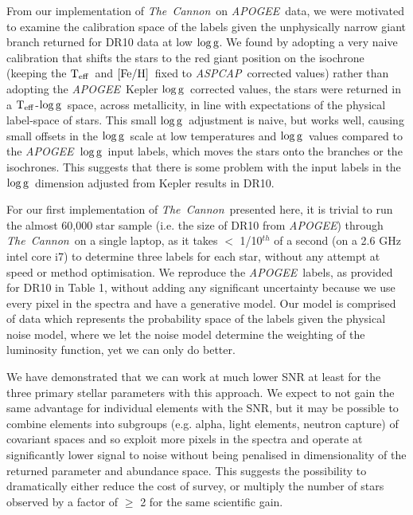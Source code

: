 \documentclass[12pt, preprint]{aastex}
\newcommand{\teff}{\mbox{$\rm T_{eff}$}}
\newcommand{\feh}{\mbox{$\rm [Fe/H]$}}
\newcommand{\logg}{\mbox{$\rm \log g$}}
\newcommand{\tc}{\textsl{The~Cannon}}
\newcommand{\apogee}{\textsl{APOGEE}}
\newcommand{\aspcap}{\textsl{ASPCAP}}
\begin{document}
From our implementation of \tc\ on \apogee\ data, we were motivated to examine the calibration space of the labels given the unphysically narrow giant branch returned for DR10 data at low \logg. We found by adopting a very naive calibration that shifts the stars to the red giant position on the isochrone (keeping the \teff\ and \feh\ fixed to \aspcap\ corrected values) rather than adopting the \apogee\ Kepler \logg\ corrected values, the stars were returned in a \teff-\logg\ space, across metallicity, in line with expectations of the physical label-space of stars. This small \logg\ adjustment is naive, but works well, causing small offsets in the \logg\ scale at low temperatures and \logg\ values compared to the \apogee\ \logg\ input labels, which moves the stars onto the branches or the isochrones. This suggests that there is some problem with the input labels in the \logg\ dimension adjusted from Kepler results in DR10. 

 For our first implementation of \tc\ presented here, it is trivial to run the almost 60,000 star sample (i.e. the size of DR10 from \apogee) through \tc\ on a single laptop, as it takes $<$ 1/10$^{th}$ of a second (on a 2.6 GHz intel core i7) to determine three labels for each star, without any attempt at speed or method optimisation. We reproduce the \apogee\ labels, as provided for DR10 in Table 1, without adding any significant uncertainty because we use every pixel in the spectra and have a generative model. Our model is comprised of data which represents the probability space of the labels given the physical noise model,  where we let the noise model determine the weighting of the luminosity function, yet we can only do better.  %
 

We have demonstrated that we can work at much lower SNR at least for the three primary stellar parameters with this approach. We expect to not gain the same advantage for individual elements with the SNR, but it may be possible to combine elements into subgroups (e.g. alpha, light elements, neutron capture) of covariant spaces \citep[e.g.][]{Ting2012} and so exploit more pixels in the spectra and operate at significantly lower signal to noise without being penalised in dimensionality of the returned parameter and abundance space. This suggests the possibility to dramatically either reduce the cost of survey, or multiply the number of stars observed by a factor of $\ge$ 2 for the same scientific gain. 
 
\end{document}
